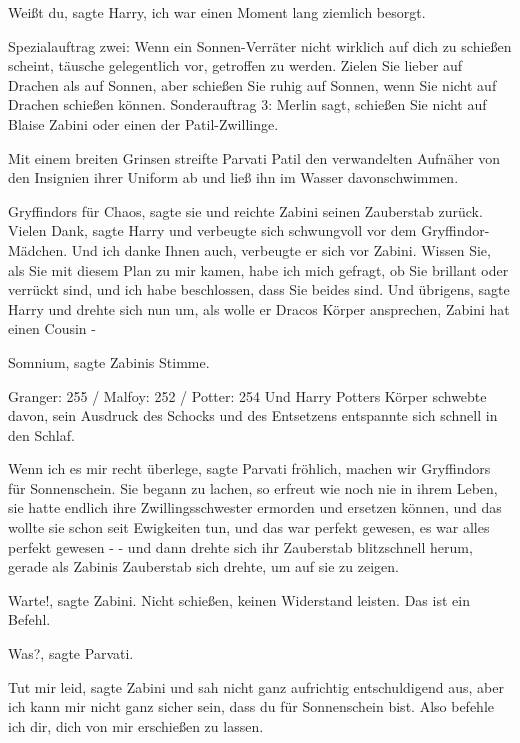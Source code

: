 \glqq{}Weißt du\grqq{}, sagte Harry, \glqq{}ich war einen Moment lang ziemlich
besorgt.\grqq{}

Spezialauftrag zwei: Wenn ein Sonnen-Verräter nicht wirklich auf dich zu
schießen scheint, täusche gelegentlich vor, getroffen zu werden. Zielen Sie
lieber auf Drachen als auf Sonnen, aber schießen Sie ruhig auf Sonnen, wenn Sie
nicht auf Drachen schießen können. Sonderauftrag 3: Merlin sagt, schießen Sie
nicht auf Blaise Zabini oder einen der Patil-Zwillinge.

Mit einem breiten Grinsen streifte Parvati Patil den verwandelten Aufnäher von
den Insignien ihrer Uniform ab und ließ ihn im Wasser davonschwimmen.

\glqq{}Gryffindors für Chaos\grqq{}, sagte sie und reichte Zabini seinen
Zauberstab zurück. \glqq{}Vielen Dank\grqq{}, sagte Harry und verbeugte sich
schwungvoll vor dem Gryffindor-Mädchen. \glqq{}Und ich danke Ihnen auch\grqq{},
verbeugte er sich vor Zabini. \glqq{}Wissen Sie, als Sie mit diesem Plan zu mir
kamen, habe ich mich gefragt, ob Sie brillant oder verrückt sind, und ich habe
beschlossen, dass Sie beides sind. Und übrigens\grqq{}, sagte Harry und drehte
sich nun um, als wolle er Dracos Körper ansprechen, \glqq{}Zabini hat einen
Cousin -\grqq{}

\glqq{}Somnium\grqq{}, sagte Zabinis Stimme.

Granger: 255 / Malfoy: 252 / Potter: 254 Und Harry Potters Körper schwebte
davon, sein Ausdruck des Schocks und des Entsetzens entspannte sich schnell in
den Schlaf.

\glqq{}Wenn ich es mir recht überlege\grqq{}, sagte Parvati fröhlich, \glqq{}
machen wir Gryffindors für Sonnenschein.\grqq{} Sie begann zu lachen, so erfreut
wie noch nie in ihrem Leben, sie hatte endlich ihre Zwillingsschwester ermorden
und ersetzen können, und das wollte sie schon seit Ewigkeiten tun, und das war
perfekt gewesen, es war alles perfekt gewesen - - und dann drehte sich ihr
Zauberstab blitzschnell herum, gerade als Zabinis Zauberstab sich drehte, um auf
sie zu zeigen.

\glqq{}Warte!\grqq{}, sagte Zabini. \glqq{}Nicht schießen, keinen Widerstand
leisten. Das ist ein Befehl.\grqq{}

\glqq{}Was?\grqq{}, sagte Parvati.

\glqq{}Tut mir leid\grqq{}, sagte Zabini und sah nicht ganz aufrichtig
entschuldigend aus, \glqq{}aber ich kann mir nicht ganz sicher sein, dass du für
Sonnenschein bist. Also befehle ich dir, dich von mir erschießen zu lassen.\grqq{}

